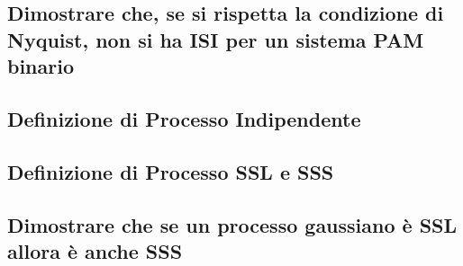 \documentclass[12pt,oneside,openany]{memoir}
\numberwithin{equation}{subsection}
\begin{document}

\subsection{Dimostrare che, se si rispetta la condizione di Nyquist, non si ha
ISI per un sistema PAM binario}


\subsection{Definizione di Processo Indipendente}


\subsection{Definizione di Processo SSL e SSS}


\subsection{Dimostrare che se un processo gaussiano \`e SSL allora \`e anche
SSS}

\end{document}
